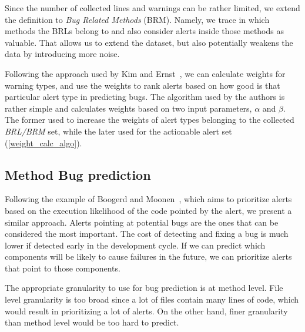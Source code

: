 
Since the number of collected lines and warnings can be rather limited, we extend the definition to \textit{Bug Related Methods} (BRM). Namely, we trace in which methods the BRLs belong to and also consider alerts inside those methods as valuable. That allows us to extend the dataset, but also potentially weakens the data by introducing more noise.

Following the approach used by Kim and Ernst~\cite{which_warnings}, we can calculate weights for warning types, and use the weights to rank alerts based on how good is that particular alert type in predicting bugs. The algorithm used by the authors is rather simple and calculates weights based on two input parameters, $\alpha$ and $\beta$. The former used to increase the weights of alert types belonging to the collected \textit{BRL/BRM} set, while the later used for the actionable alert set (\cref{weight_calc_algo}).


\subsection{Method Bug prediction}
\label{method:bugprediction}

Following the example of Boogerd and Moonen~\cite{static_profiling}, which aims to prioritize alerts based on the execution likelihood of the code pointed by the alert, we present a similar approach. Alerts pointing at potential bugs are the ones that can be considered the most important. The cost of detecting and fixing a bug is much lower if detected early in the development cycle. If we can predict which components will be likely to cause failures in the future, we can prioritize alerts that point to those components.

The appropriate granularity to use for bug prediction is at method level. File level granularity is too broad since a lot of files contain many lines of code, which would result in prioritizing a lot of alerts. On the other hand, finer granularity than method level would be too hard to predict.

